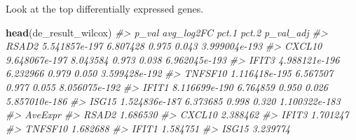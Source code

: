 \documentclass[
]{book}
\newenvironment{Shaded}{\begin{snugshade}}{\end{snugshade}}
\newcommand{\CommentTok}[1]{\textcolor[rgb]{0.56,0.35,0.01}{\textit{#1}}}
\newcommand{\FunctionTok}[1]{\textcolor[rgb]{0.13,0.29,0.53}{\textbf{#1}}}
\newcommand{\NormalTok}[1]{#1}
\begin{document}
Look at the top differentially expressed genes.

\begin{Shaded}
\begin{Highlighting}[]
\FunctionTok{head}\NormalTok{(de\_result\_wilcox)}
\CommentTok{\#\textgreater{}                 p\_val avg\_log2FC pct.1 pct.2     p\_val\_adj}
\CommentTok{\#\textgreater{} RSAD2   5.541857e{-}197   6.807428 0.975 0.043 3.999004e{-}193}
\CommentTok{\#\textgreater{} CXCL10  9.648067e{-}197   8.043584 0.973 0.038 6.962045e{-}193}
\CommentTok{\#\textgreater{} IFIT3   4.988121e{-}196   6.232966 0.979 0.050 3.599428e{-}192}
\CommentTok{\#\textgreater{} TNFSF10 1.116418e{-}195   6.567507 0.977 0.055 8.056075e{-}192}
\CommentTok{\#\textgreater{} IFIT1   8.116699e{-}190   6.764859 0.950 0.026 5.857010e{-}186}
\CommentTok{\#\textgreater{} ISG15   1.524836e{-}187   6.373685 0.998 0.320 1.100322e{-}183}
\CommentTok{\#\textgreater{}          AveExpr}
\CommentTok{\#\textgreater{} RSAD2   1.686530}
\CommentTok{\#\textgreater{} CXCL10  2.388462}
\CommentTok{\#\textgreater{} IFIT3   1.701247}
\CommentTok{\#\textgreater{} TNFSF10 1.682688}
\CommentTok{\#\textgreater{} IFIT1   1.584751}
\CommentTok{\#\textgreater{} ISG15   3.239774}
\end{Highlighting}
\end{Shaded}
\end{document}
